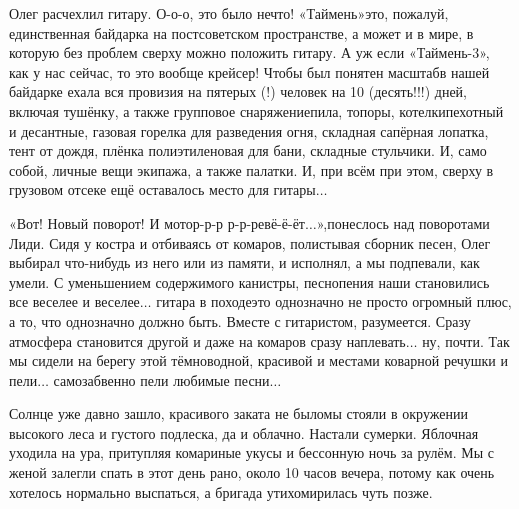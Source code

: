 Олег расчехлил гитару. О-о-о, это было нечто! «Таймень»\mdash это, пожалуй, единственная байдарка на постсоветском пространстве, а может и в мире, в которую без проблем сверху можно положить гитару. А уж если «Таймень-3», как у нас сейчас, то это вообще крейсер! Чтобы был понятен масштаб\mdash в нашей байдарке ехала вся провизия на пятерых (!) человек на 10 (десять!!!) дней, включая тушёнку, а также групповое снаряжение\mdash пила, топоры, котелки\mdash пехотный и десантные, газовая горелка для разведения огня, складная сапёрная лопатка, тент от дождя, плёнка полиэтиленовая для бани, складные стульчики. И, само собой, личные вещи экипажа, а также палатки. И, при всём при этом, сверху в грузовом отсеке ещё оставалось место для гитары$\ldots$

«Вот! Новый поворот! И мотор-р-р  р-р-ревё-ё-ёт$\ldots$»,\mdash понеслось над поворотами Лиди. Сидя у костра и отбиваясь от комаров, полистывая сборник песен, Олег выбирал что-нибудь из него или из памяти, и исполнял, а мы подпевали, как умели. С уменьшением содержимого канистры, песнопения наши становились все веселее и веселее$\ldots$ гитара в походе\mdash это однозначно не просто огромный плюс, а то, что однозначно должно быть. Вместе с гитаристом, разумеется. Сразу атмосфера становится другой и даже на комаров сразу наплевать$\ldots$ ну, почти. Так мы сидели на берегу этой тёмноводной, красивой и местами коварной речушки и пели$\ldots$ самозабвенно пели любимые песни$\ldots$

Солнце уже давно зашло, красивого заката не было\mdash мы стояли в окружении высокого леса и густого подлеска, да и облачно. Настали сумерки. Яблочная уходила на ура, притупляя комариные укусы и бессонную ночь за рулём. Мы с женой залегли спать в этот день рано, около 10 часов вечера, потому как очень хотелось нормально выспаться, а бригада утихомирилась чуть позже.

\begin{center}
\end{center}
